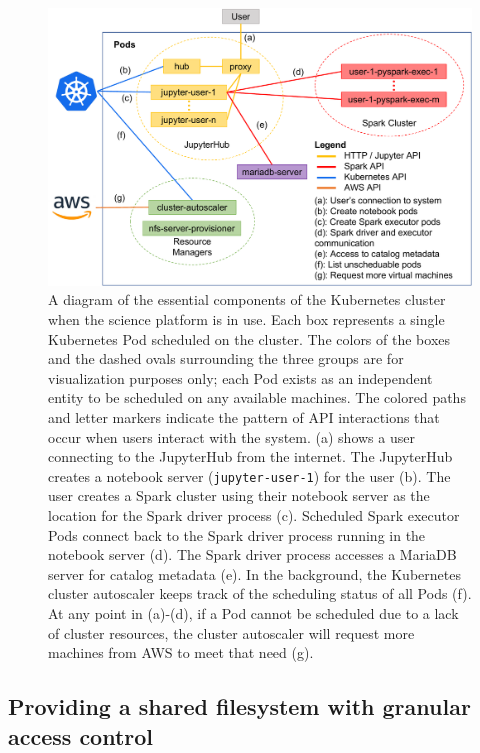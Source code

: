 \documentclass[twocolumn, linenumbers]{aastex631}
\begin{document}
\begin{figure}
\centerline{\includegraphics[width=\linewidth]{k8s_cluster.pdf}}
\caption{A diagram of the essential components of the Kubernetes cluster when the science platform is in use. Each box represents a single Kubernetes Pod scheduled on the cluster. The colors of the boxes and the dashed ovals surrounding the three groups are for visualization purposes only; each Pod exists as an independent entity to be scheduled on any available machines. The colored paths and letter markers indicate the pattern of API interactions that occur when users interact with the system. (a) shows a user connecting to the JupyterHub from the internet. The JupyterHub creates a notebook server (\texttt{jupyter-user-1}) for the user (b). The user creates a Spark cluster using their notebook server as the location for the Spark driver process (c). Scheduled Spark executor Pods connect back to the Spark driver process running in the notebook server (d). The Spark driver process accesses a MariaDB server for catalog metadata (e). In the background, the Kubernetes cluster autoscaler keeps track of the scheduling status of all Pods (f). At any point in (a)-(d), if a Pod cannot be scheduled due to a lack of cluster resources, the cluster autoscaler will request more machines from AWS to meet that need (g).}
\label{fig:cluster}
\end{figure}

\subsection{Providing a shared filesystem with granular access control}
\label{sec:nfs}
\end{document}

